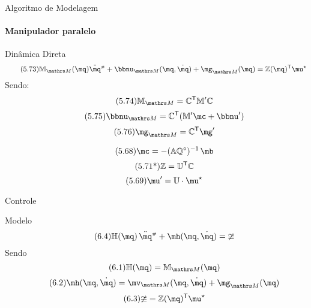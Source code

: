 \documentclass[25pt,landscape]{beamer}
\begin{document}
\begin{frame}{Algoritmo de Modelagem}
    \framesubtitle{Manipulador paralelo}
    \begin{block}{Dinâmica Direta}
    	\pause
    	\begin{equation} \label{eq:DinamicaInversa2} \tag{5.73}
			\mM_{\ssM} (\mq) \ddot{\mq}\ssh + \mnu_{\ssM}(\mq, \dot{\mq}) + \mg_{\ssM}(\mq)   = \mZ(\mq)^{\msT} \mu^\star
		\end{equation}
		\pause
		Sendo: 
		\begin{equation} \tag{5.74}
			\mM_{\ssM}  =  \mC^\msT \mM' \mC
		\end{equation}
		\begin{equation} \tag{5.75}
			\mnu_{\ssM}  =  \mC^\msT (  \mM'  \mc  + \mnu' )
		\end{equation}
		\begin{equation} \tag{5.76}
			\mg_{\ssM}  = \mC^\msT \mg'
		\end{equation}

		\pause
		\begin{equation} \tag{5.68}
			\mc = - (\mA \mQ\cir)^\msI \, \mb
		\end{equation}
		\begin{equation} \tag{5.71*}
			\mathbb{Z} = \mathbb{U}^{\mathsf{T}} \mathbb{C}
		\end{equation}
		\begin{equation} \label{eq:u_estrela} \tag{5.69}
			\mu' = \mU \cdot \mu^\star
		\end{equation}
    \end{block}
\end{frame}

\begin{frame}{Controle}
    \pause
    \begin{block}{Modelo}
    	\begin{equation} \label{eq:ModeloControle} \tag{6.4}
			\mH(\mq) \, \ddot{\mq}\ssh + \mh(\mq,\dot{\mq}) = \mup
		\end{equation}
		\pause
		Sendo
		\begin{equation} \tag{6.1}
			\mH(\mq) = \mM_{\ssM}(\mq)
		\end{equation}
		\begin{equation} \tag{6.2}
			\mh(\mq, \dot{\mq}) = \mv_{\ssM}(\mq, \dot{\mq}) + \mg_{\ssM}(\mq)
		\end{equation}
		\begin{equation} \tag{6.3}
			\mup = \mZ(\mq)^{\msT} \mu^\star
		\end{equation}
    \end{block}
\end{frame}
\end{document}
